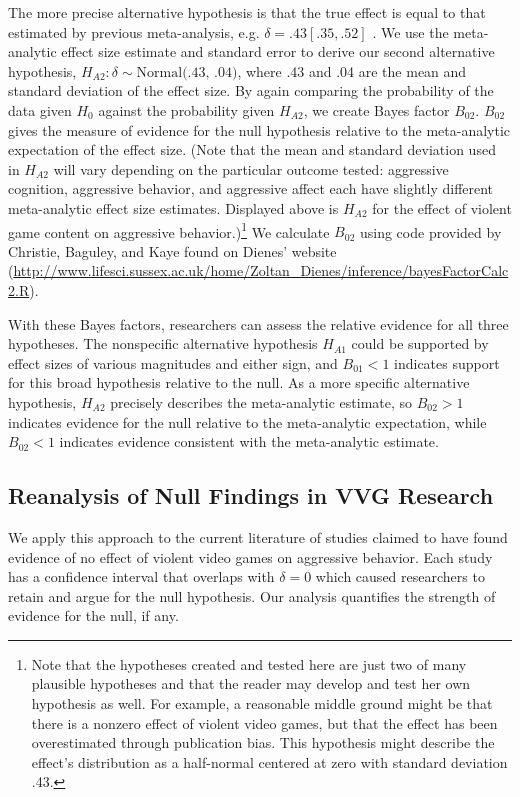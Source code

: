 \documentclass[man]{apa6}
\begin{document}
The more precise alternative hypothesis is that the true effect is equal to that estimated by previous meta-analysis, e.g. $\delta = .43 [.35, .52]$ \citep{Anderson:etal:2010}.  We use the meta-analytic effect size estimate and standard error to derive our second alternative hypothesis, $H_{A2}: \delta \sim{} \mbox{Normal(.43, .04)}$, where .43 and .04 are the mean and standard deviation of the effect size. 
By again comparing the probability of the data given $H_0$ against the probability given $H_{A2}$, we create Bayes factor $B_{02}$. $B_{02}$ gives the measure of evidence for the null hypothesis relative to the meta-analytic expectation of the effect size. (Note that the mean and standard deviation used in $H_{A2}$ will vary depending on the particular outcome tested: aggressive cognition, aggressive behavior, and aggressive affect each have slightly different meta-analytic effect size estimates. Displayed above is $H_{A2}$ for the effect of violent game content on aggressive behavior.)\footnote{Note that the hypotheses created and tested here are just two of many plausible hypotheses and that the reader may develop and test her own hypothesis as well. For example, a reasonable middle ground might be that there is a nonzero effect of violent video games, but that the effect has been overestimated through publication bias. This hypothesis might describe the effect's distribution as a half-normal centered at zero with standard deviation .43.} 
We calculate $B_{02}$ using code provided by Christie, Baguley, and Kaye found on Dienes' website (\url{http://www.lifesci.sussex.ac.uk/home/Zoltan_Dienes/inference/bayesFactorCalc2.R}).  %

With these Bayes factors, researchers can assess the relative evidence for all three hypotheses. The nonspecific alternative hypothesis $H_{A1}$ could be supported by effect sizes of various magnitudes and either sign, and $B_{01} < 1$ indicates support for this broad hypothesis relative to the null. As a more specific alternative hypothesis, $H_{A2}$ precisely describes the meta-analytic estimate, so $B_{02} > 1$ indicates evidence for the null relative to the meta-analytic expectation, while $B_{02} < 1$ indicates evidence consistent with the meta-analytic estimate. 

\subsection{Reanalysis of Null Findings in VVG Research}
We apply this approach to the current literature of studies claimed to have found evidence of no effect of violent video games on aggressive behavior. Each study has a confidence interval that overlaps with $\delta = 0$ which caused researchers to retain and argue for the null hypothesis. Our analysis quantifies the strength of evidence for the null, if any.
\end{document}
